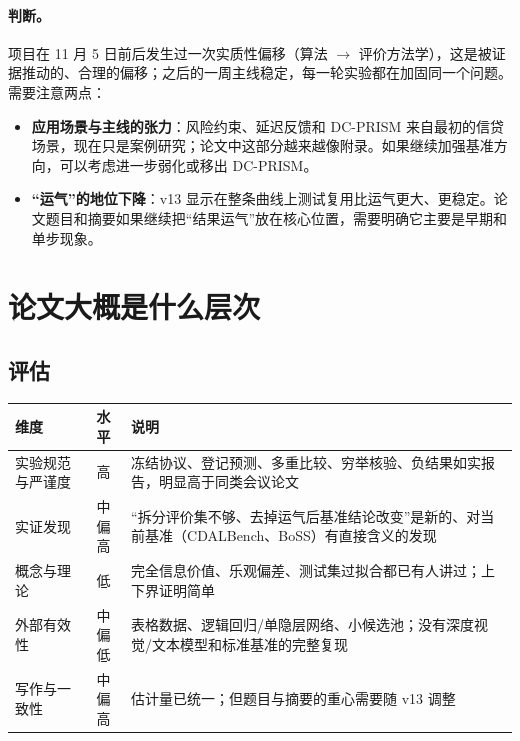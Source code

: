 \documentclass[11pt,a4paper]{article}
\begin{document}
\paragraph{判断。}项目在 11 月 5 日前后发生过一次实质性偏移（算法 $\to$ 评价方法学），这是被证据推动的、合理的偏移；之后的一周主线稳定，每一轮实验都在加固同一个问题。需要注意两点：
\begin{itemize}
\item \textbf{应用场景与主线的张力}：风险约束、延迟反馈和 DC-PRISM 来自最初的信贷场景，现在只是案例研究；论文中这部分越来越像附录。如果继续加强基准方向，可以考虑进一步弱化或移出 DC-PRISM。
\item \textbf{“运气”的地位下降}：v13 显示在整条曲线上测试复用比运气更大、更稳定。论文题目和摘要如果继续把“结果运气”放在核心位置，需要明确它主要是早期和单步现象。
\end{itemize}

\section{论文大概是什么层次}
\subsection{评估}
\begin{table}[H]
\centering\small
\begin{tabular}{L{3.8cm}cL{9.4cm}}
\toprule
维度 & 水平 & 说明 \\
\midrule
实验规范与严谨度 & 高 & 冻结协议、登记预测、多重比较、穷举核验、负结果如实报告，明显高于同类会议论文 \\
实证发现 & 中偏高 & “拆分评价集不够、去掉运气后基准结论改变”是新的、对当前基准（CDALBench、BoSS）有直接含义的发现 \\
概念与理论 & 低 & 完全信息价值、乐观偏差、测试集过拟合都已有人讲过；上下界证明简单 \\
外部有效性 & 中偏低 & 表格数据、逻辑回归/单隐层网络、小候选池；没有深度视觉/文本模型和标准基准的完整复现 \\
写作与一致性 & 中偏高 & 估计量已统一；但题目与摘要的重心需要随 v13 调整 \\
\bottomrule
\end{tabular}
\end{table}
\end{document}
